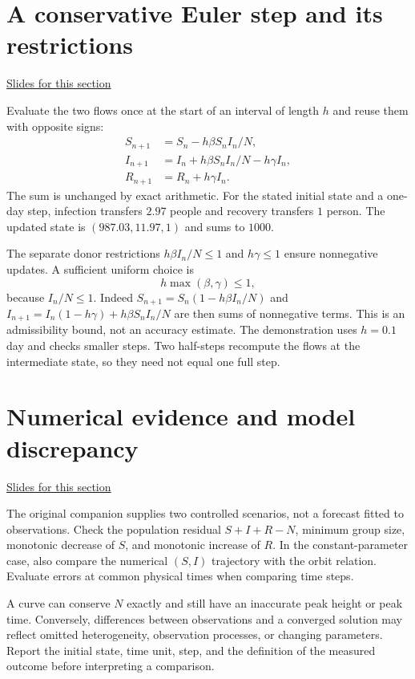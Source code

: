 \documentclass[11pt,letterpaper]{article}
\theoremstyle{definition}\newtheorem{definition}{Definition}\newtheorem{example}{Example}
\numberwithin{equation}{section}
\begin{document}
\section{A conservative Euler step and its restrictions}
\hypertarget{note-a-conservative-euler-step-and-its-restrictions}{}\label{note:a-conservative-euler-step-and-its-restrictions}
{\small \href{slides.html\#frame=one-conservative-numerical-step\&step=1}{Slides for this section}}\par
Evaluate the two flows once at the start of an interval of length $h$ and reuse them with opposite signs:
\[
\begin{aligned}
S_{n+1}&=S_n-h\beta S_nI_n/N,\\
I_{n+1}&=I_n+h\beta S_nI_n/N-h\gamma I_n,\\
R_{n+1}&=R_n+h\gamma I_n.
\end{aligned}
\]
The sum is unchanged by exact arithmetic. For the stated initial state and a one-day step, infection transfers $2.97$ people and recovery transfers $1$ person. The updated state is $(987.03,11.97,1)$ and sums to $1000$.

The separate donor restrictions $h\beta I_n/N\leq1$ and $h\gamma\leq1$ ensure nonnegative updates. A sufficient uniform choice is
\[
h\max(\beta,\gamma)\leq1,
\]
because $I_n/N\leq1$. Indeed $S_{n+1}=S_n(1-h\beta I_n/N)$ and $I_{n+1}=I_n(1-h\gamma)+h\beta S_nI_n/N$ are then sums of nonnegative terms. This is an admissibility bound, not an accuracy estimate. The demonstration uses $h=0.1$ day and checks smaller steps. Two half-steps recompute the flows at the intermediate state, so they need not equal one full step.
\section{Numerical evidence and model discrepancy}
\hypertarget{note-numerical-evidence-and-model-discrepancy}{}\label{note:numerical-evidence-and-model-discrepancy}
{\small \href{slides.html\#frame=changing-one-transmission-parameter\&step=1}{Slides for this section}}\par
The original companion supplies two controlled scenarios, not a forecast fitted to observations. Check the population residual $S+I+R-N$, minimum group size, monotonic decrease of $S$, and monotonic increase of $R$. In the constant-parameter case, also compare the numerical $(S,I)$ trajectory with the orbit relation. Evaluate errors at common physical times when comparing time steps.

A curve can conserve $N$ exactly and still have an inaccurate peak height or peak time. Conversely, differences between observations and a converged solution may reflect omitted heterogeneity, observation processes, or changing parameters. Report the initial state, time unit, step, and the definition of the measured outcome before interpreting a comparison.
\end{document}
